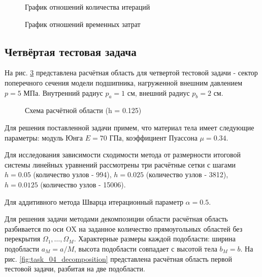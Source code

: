 \documentclass[a4paper, 14pt]{extarticle}
\newcommand{\area}{rectangle}
\newcommand{\task}{3_fixes}
\newcommand{\taskNum}{01}
\begin{document}
\newpage

\begin{figure}[H]
\caption{График отношений количества итераций}
\label{fig:task_\taskNum_iters_cg}
\end{figure}
\begin{figure}[H]
\caption{График отношений временных затрат}
\label{fig:task_\taskNum_time_cg}
\end{figure}

\newpage

\subsection{Четвёртая тестовая задача}

\renewcommand{\area}{bearing}
\renewcommand{\task}{pressure_only}
\renewcommand{\taskNum}{04}

На рис. \ref{fig:task_\taskNum_scheme} представлена расчётная область для четвертой тестовой задачи - сектор поперечного сечения модели подшипника, нагруженной внешним давлением $p = 5$ МПа. Внутренний радиус $p_a = 1$ см, внешний радиус $p_b = 2 $ см.

\begin{figure}[h]
\caption{Схема расчётной области (h = 0.125)}
\label{fig:task_\taskNum_scheme}
\end{figure}

Для решения поставленной задачи примем, что материал тела имеет следующие параметры: модуль Юнга $E = 70$ ГПа, коэффициент Пуассона $\mu = 0.34$. 

Для исследования зависимости сходимости метода от размерности итоговой системы линейных уравнений рассмотрены три расчётные сетки с шагами $h = 0.05$ (количество узлов - 994), $h = 0.025$ (количество узлов - 3812), $h = 0.0125$ (количество узлов - 15006).

Для аддитивного метода Шварца итерационный параметр $\alpha = 0.5$.

\newpage

Для решения задачи методами декомпозиции области расчётная область разбивается по оси OX на заданное количество прямоугольных областей без перекрытия $\Omega_1, \ldots, \Omega_M$. Характерные размеры каждой подобласти: ширина подобласти $a_M = a / M$, высота подобласти совпадает с высотой тела $b_M = b$. На рис. \ref{fig:task_\taskNum_decomposition} представлена расчётная область первой тестовой задачи, разбитая на две подобласти.
\end{document}
